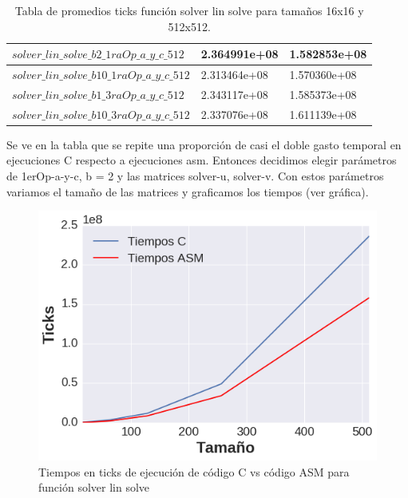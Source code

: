 \begin{table}[htbp]
\begin{center}
\begin{tabular}{|l|l|l|}
$solver\_lin\_solve\_b2\_1raOp\_a\_y\_c\_512$ & 2.364991e+08  &  1.582853e+08\\ \hline

$solver\_lin\_solve\_b10\_1raOp\_a\_y\_c\_512$ & 2.313464e+08   &  1.570360e+08\\ \hline

$solver\_lin\_solve\_b1\_3raOp\_a\_y\_c\_512$ & 2.343117e+08  & 1.585373e+08\\ \hline

$solver\_lin\_solve\_b10\_3raOp\_a\_y\_c\_512$ & 2.337076e+08 & 1.611139e+08\\ \hline

\end{tabular}
\caption{Tabla de promedios ticks función solver lin solve para tamaños 16x16 y 512x512.}
\end{center}
\end{table}
 Se ve en la tabla que se repite una proporción de casi el doble gasto temporal en ejecuciones C respecto a ejecuciones asm. Entonces decidimos elegir parámetros de 1erOp-a-y-c, b = 2 y las matrices solver-u, solver-v. Con estos parámetros variamos el tamaño de las matrices y graficamos los tiempos (ver gráfica).
\begin{figure}[h]

\centering
\includegraphics[scale=0.6] {solver_lin_solve}
  
 \caption{Tiempos en ticks de ejecución de código C vs código ASM para función solver lin solve}
\end{figure} 

